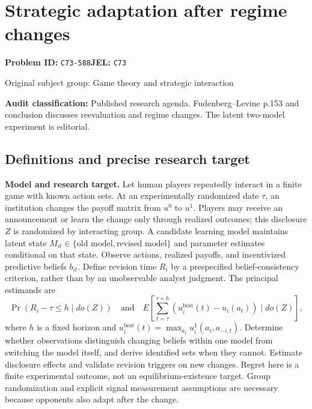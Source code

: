 \documentclass[11pt,a4paper]{article}
\begin{document}
\section*{Strategic adaptation after regime changes}
\textbf{Problem ID:} \texttt{C73-588}\quad \textbf{JEL:} \texttt{C73}\par
\label{problem:OP-0283}
{\sffamily\small\color{muted}Original subject group: Game theory and strategic interaction\par}
\label{definitions:problem:30007565}
\textbf{Audit classification:} Published research agenda. Fudenberg–Levine p.153 and conclusion discusses reevaluation and regime changes. The latent two-model experiment is editorial.
\subsection*{Definitions and precise research target}
\textbf{Model and research target.} Let human players repeatedly interact in a finite game with known action sets. At an experimentally randomized date \(\tau\), an institution changes the payoff matrix from \(u^0\) to \(u^1\). Players may receive an announcement or learn the change only through realized outcomes; this disclosure \(Z\) is randomized by interacting group. A candidate learning model maintains latent state \(M_{it}\in\{\text{old model},\text{revised model}\}\) and parameter estimates conditional on that state. Observe actions, realized payoffs, and incentivized predictive beliefs \(b_{it}\). Define revision time \(R_i\) by a prespecified belief-consistency criterion, rather than by an unobservable analyst judgment. The principal estimands are
\[
 \Pr(R_i-\tau\leq h\mid do(Z))
 \quad\text{and}\quad
 E\left[\sum_{t=\tau}^{\tau+h}(u_i^{\mathrm{best}}(t)-u_i(a_t))\mid do(Z)\right],
\]
where \(h\) is a fixed horizon and \(u_i^{\mathrm{best}}(t)=\max_{a_i}u_i^1(a_i,a_{-i,t})\). Determine whether observations distinguish changing beliefs within one model from switching the model itself, and derive identified sets when they cannot. Estimate disclosure effects and validate revision triggers on new changes. Regret here is a finite experimental outcome, not an equilibrium-existence target. Group randomization and explicit signal measurement assumptions are necessary because opponents also adapt after the change.
\end{document}
